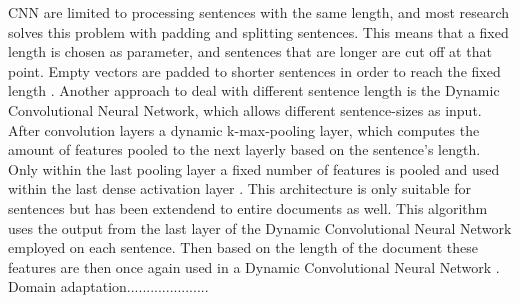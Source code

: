 CNN are limited to processing sentences with the same length, and most research solves this problem with padding and splitting sentences. This means that a fixed length is chosen as parameter, and sentences that are longer are cut off at that point. Empty vectors are padded to shorter sentences in order to reach the fixed length \cite{kim2014convolutional}  \cite{zhang2015sensitivity}. 
Another approach to deal with different sentence length is the Dynamic Convolutional Neural Network, which allows different sentence-sizes as input. After convolution layers a dynamic k-max-pooling layer, which computes the amount of features pooled to the next layerly based on the sentence's length. Only within the last pooling layer a fixed number of features is pooled and used within the last dense activation layer \cite{kalchbrenner2014convolutional}. This architecture is only suitable for sentences but has been extendend to entire documents as well. This algorithm uses the output from the last layer of the Dynamic Convolutional Neural Network employed on each sentence. Then based on the length of the document these features are then once again used in a Dynamic Convolutional Neural Network \cite{denil2014modelling}. 
Domain adaptation.....................\\



